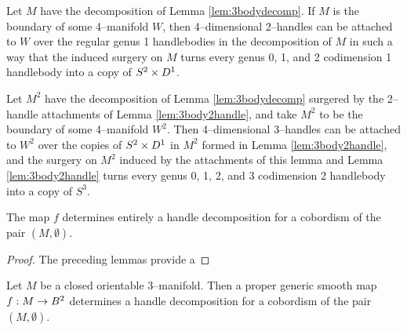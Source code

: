 \begin{lem}
	\label{lem:3body2handle}
	Let $M$ have the decomposition of Lemma \ref{lem:3bodydecomp}.
	If $M$ is the boundary of some 4--manifold $W$, then 4--dimensional 2--handles can be attached to $W$ over the regular genus 1 handlebodies in the decomposition of $M$ in such a way that the induced surgery on $M$ turns every genus 0, 1, and 2 codimension 1 handlebody into a copy of $S^2\times D^1$.
\end{lem}

\begin{lem}
	\label{lem:3body3handle}
	Let $M^2$ have the decomposition of Lemma \ref{lem:3bodydecomp} surgered by the 2--handle attachments of Lemma \ref{lem:3body2handle}, and take $M^2$ to be the boundary of some 4--manifold $W^2$.
	Then 4--dimensional 3--handles can be attached to $W^2$ over the copies of $S^2\times D^1$ in $M^2$ formed in Lemma \ref{lem:3body2handle}, and the surgery on $M^2$ induced by the attachments of this lemma and Lemma \ref{lem:3body2handle} turns every genus 0, 1, 2, and 3 codimension 2 handlebody into a copy of $S^3$.
\end{lem}

\begin{theorem}
	\label{lem:3body4handle}
	\label{thm:3bound4}
	The map $f$ determines entirely a handle decomposition for a cobordism of the pair $(M,\emptyset)$.
\end{theorem}

\begin{proof}
	The preceding lemmas provide a
	
\end{proof}

\begin{theorem}

	Let $M$ be a closed orientable 3--manifold.
	Then a proper generic smooth map $f:M\to B^2$ determines a handle decomposition for a cobordism of the pair $(M,\emptyset)$.
\end{theorem}

